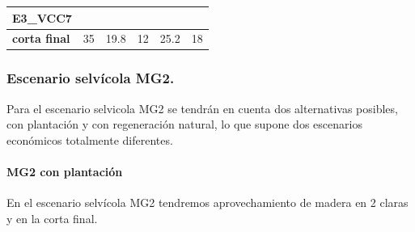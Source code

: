 \documentclass[]{article}
\let\oldparagraph\paragraph
\renewcommand{\paragraph}[1]{\oldparagraph{#1}\mbox{}}
\begin{document}
\begin{longtable}[]{@{}lrrrrr@{}}
\begin{minipage}[b]{0.13\columnwidth}
E3\_VCC7\strut
\end{minipage}\tabularnewline
\midrule
\endhead
\begin{minipage}[t]{0.21\columnwidth}\raggedright\strut
\textbf{corta final}\strut
\end{minipage} & \begin{minipage}[t]{0.13\columnwidth}\raggedleft\strut
35\strut
\end{minipage} & \begin{minipage}[t]{0.13\columnwidth}\raggedleft\strut
19.8\strut
\end{minipage} & \begin{minipage}[t]{0.12\columnwidth}\raggedleft\strut
12\strut
\end{minipage} & \begin{minipage}[t]{0.13\columnwidth}\raggedleft\strut
25.2\strut
\end{minipage} & \begin{minipage}[t]{0.13\columnwidth}\raggedleft\strut
18\strut
\end{minipage}\tabularnewline
\bottomrule
\end{longtable}

\subsubsection{Escenario selvícola
MG2.}\label{escenario-selvuxedcola-mg2.}

Para el escenario selvicola MG2 se tendrán en cuenta dos alternativas
posibles, con plantación y con regeneración natural, lo que supone dos
escenarios económicos totalmente diferentes.

\paragraph{MG2 con plantación}\label{mg2-con-plantaciuxf3n}

En el escenario selvícola MG2 tendremos aprovechamiento de madera en 2
claras y en la corta final.
\end{document}
